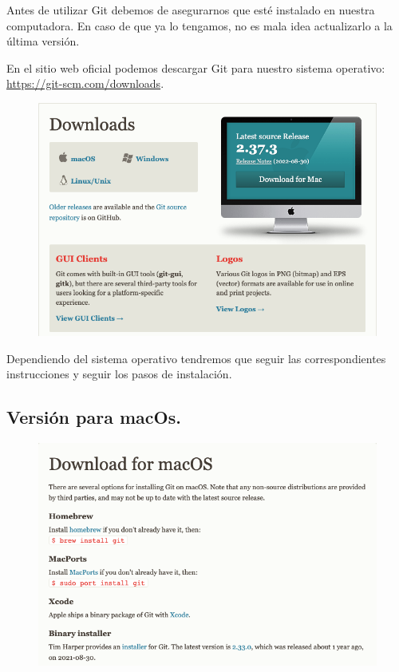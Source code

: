 Antes de utilizar Git debemos de asegurarnos que esté instalado en nuestra computadora. En caso de que ya lo tengamos, no es mala idea actualizarlo a la última versión.
\par
En el sitio web oficial podemos descargar Git para nuestro sistema operativo: \href{https://git-scm.com/downloads}{https://git-scm.com/downloads}.
\begin{figure}[H]
    \centering
    \includegraphics[scale=0.4]{Imagenes/git_01.png}
\end{figure}

Dependiendo del sistema operativo tendremos que seguir las correspondientes instrucciones y seguir los pasos de instalación.

\subsection*{Versión para macOs.}

\begin{figure}[H]
    \centering
    \includegraphics[scale=0.35]{Imagenes/git_02.png}
\end{figure}

